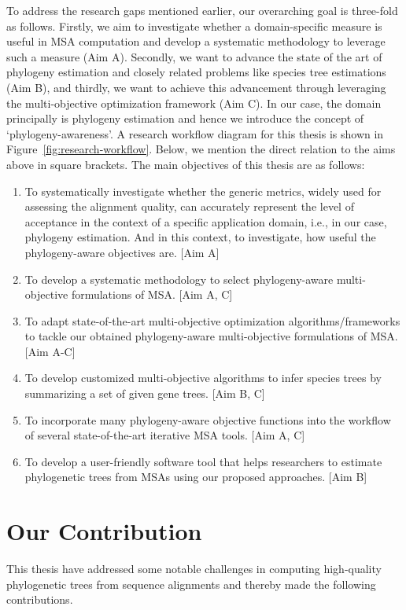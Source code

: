 To address the research gaps mentioned earlier, our overarching goal is three-fold as follows. Firstly, we aim to investigate whether a domain-specific measure is useful in MSA computation and develop a systematic methodology to leverage such a measure (Aim A). Secondly, we want to advance the state of the art of phylogeny estimation and closely related problems like species tree estimations (Aim B), and thirdly, we want to achieve this advancement through leveraging the multi-objective optimization framework (Aim C). In our case, the domain principally is phylogeny estimation and hence we introduce the concept of ‘phylogeny-awareness’. A research workflow diagram for this thesis is shown in Figure~\ref{fig:research-workflow}. Below, we mention the direct relation to the aims above in square brackets. The main objectives of this thesis are as follows:

\begin{enumerate}
\item To systematically investigate whether the generic metrics, widely used for assessing the alignment quality, can accurately represent the level of acceptance in the context of a specific application domain, i.e., in our case, phylogeny estimation. And in this context, to investigate, how useful the phylogeny-aware objectives are. [Aim A]

\item To develop a systematic methodology to select phylogeny-aware multi-objective formulations of MSA. [Aim A, C]

\item To adapt state-of-the-art multi-objective optimization algorithms/frameworks to tackle our obtained phylogeny-aware multi-objective formulations of MSA. [Aim A-C]

\item To develop customized multi-objective algorithms to infer species trees by summarizing a set of given gene trees. [Aim B, C]

\item To incorporate many phylogeny-aware objective functions into the workflow of several state-of-the-art iterative MSA tools. [Aim A, C]

\item To develop a user-friendly software tool that helps researchers to estimate phylogenetic trees from MSAs using our proposed approaches. [Aim B]
\end{enumerate}

\section{Our Contribution}
This thesis have addressed some notable challenges in computing high-quality phylogenetic trees from sequence alignments and thereby made the following contributions.

